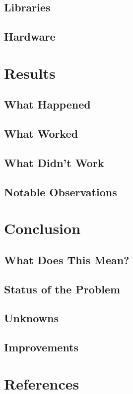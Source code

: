 \documentclass[11pt,letterpaper]{article}
\begin{document}
	\subsection{Libraries}
	\subsection{Hardware}

	\section{Results}
	\subsection{What Happened}
	\subsection{What Worked}
	\subsection{What Didn't Work}
	\subsection{Notable Observations}

	\section{Conclusion}
	\subsection{What Does This Mean?}
	\subsection{Status of the Problem}
	\subsection{Unknowns}
	\subsection{Improvements}

	\section{References}
\end{document}
